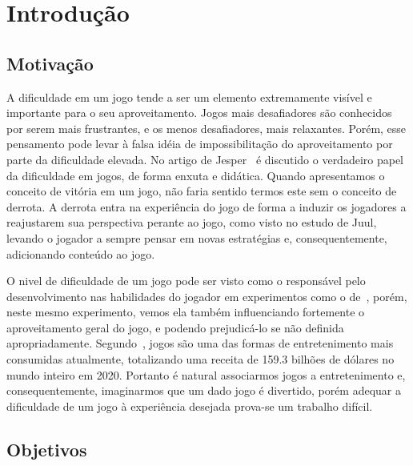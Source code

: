 
\chapter{Introdução}
\label{cap:introducao}
\section{Motivação}

A dificuldade em um jogo tende a ser um elemento extremamente visível e importante para o seu aproveitamento. Jogos mais desafiadores são conhecidos por serem mais frustrantes, e os menos desafiadores, mais relaxantes. Porém, esse pensamento pode levar à falsa idéia de impossibilitação do aproveitamento por parte da dificuldade elevada. No artigo de Jesper~\citet{FearOfFailing} é discutido o verdadeiro papel da dificuldade em jogos, de forma enxuta e didática. Quando apresentamos o conceito de vitória em um jogo, não faria sentido termos este sem o conceito de derrota. A derrota entra na experiência do jogo de forma a induzir os jogadores a reajustarem sua perspectiva perante ao jogo, como visto no estudo de Juul, levando o jogador a sempre pensar em novas estratégias e, consequentemente, adicionando conteúdo ao jogo.

O nivel de dificuldade de um jogo pode ser visto como o responsável pelo desenvolvimento nas habilidades do jogador em experimentos como o de~\citet{ExperimentalValidation}, porém, neste mesmo experimento, vemos ela também influenciando fortemente o aproveitamento geral do jogo, e podendo prejudicá-lo se não definida apropriadamente. Segundo~\citet{VideoGameBusiness}, jogos são uma das formas de entretenimento mais consumidas atualmente, totalizando uma receita de 159.3 bilhões de dólares no mundo inteiro em 2020. Portanto é natural associarmos jogos a entretenimento e, consequentemente, imaginarmos que um dado jogo é divertido, porém adequar a dificuldade de um jogo à experiência desejada prova-se um trabalho difícil.

\section{Objetivos}

